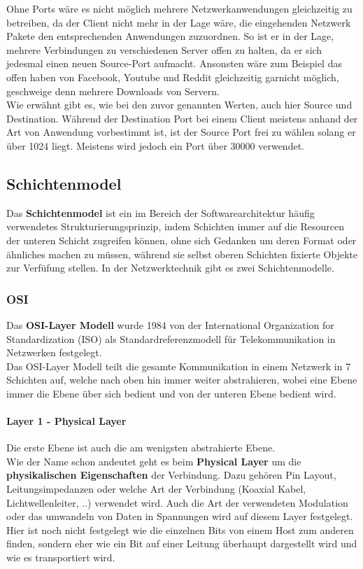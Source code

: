 \documentclass[12pt,a4paper]{report}
\begin{document}
Ohne Ports wäre es nicht möglich mehrere Netzwerkanwendungen gleichzeitig zu betreiben, da der Client nicht mehr in der Lage wäre, die eingehenden Netzwerk Pakete den entsprechenden Anwendungen zuzuordnen. So ist er in der Lage, mehrere Verbindungen zu verschiedenen Server offen zu halten, da er sich jedesmal einen neuen Source-Port aufmacht. Ansonsten wäre zum Beispiel das offen haben von Facebook, Youtube und Reddit gleichzeitig garnicht möglich, geschweige denn mehrere Downloads von Servern.\\

Wie erwähnt gibt es, wie bei den zuvor genannten Werten, auch hier Source und Destination. Während der Destination Port bei einem Client meistens anhand der Art von Anwendung vorbestimmt ist, ist der Source Port frei zu wählen solang er über 1024 liegt. Meistens wird jedoch ein Port über 30000 verwendet. 
\subsection{Schichtenmodel}
Das \textbf{Schichtenmodel} ist ein im Bereich der Softwarearchitektur häufig verwendetes Strukturierungsprinzip, indem Schichten immer auf die Resourcen der unteren Schicht zugreifen können, ohne sich Gedanken um deren Format oder ähnliches machen zu müssen, während sie selbst oberen Schichten fixierte Objekte zur Verfüfung stellen. In der Netzwerktechnik gibt es zwei Schichtenmodelle.
\subsubsection{OSI}
Das \textbf{OSI-Layer Modell} wurde 1984 von der International Organization for Standardization (ISO) als Standardreferenzmodell für Telekommunikation in Netzwerken festgelegt.\\
Das OSI-Layer Modell teilt die gesamte Kommunikation in einem Netzwerk in 7 Schichten auf, welche nach oben hin immer weiter abstrahieren, wobei eine Ebene immer die Ebene über sich bedient und von der unteren Ebene bedient wird.\\
\paragraph{Layer 1 - Physical Layer}
Die erste Ebene ist auch die am wenigsten abstrahierte Ebene.\\
Wie der Name schon andeutet geht es beim \textbf{Physical Layer} um die \textbf{physikalischen Eigenschaften} der Verbindung. Dazu gehören Pin Layout, Leitungsimpedanzen oder welche Art der Verbindung (Koaxial Kabel, Lichtwellenleiter, ..) verwendet wird. Auch die Art der verwendeten Modulation oder das umwandeln von Daten in Spannungen wird auf diesem Layer festgelegt.\\ Hier ist noch nicht festgelegt wie die einzelnen Bits von einem Host zum anderen finden, sondern eher wie ein Bit auf einer Leitung überhaupt dargestellt wird und wie es transportiert wird.\\
\end{document}
